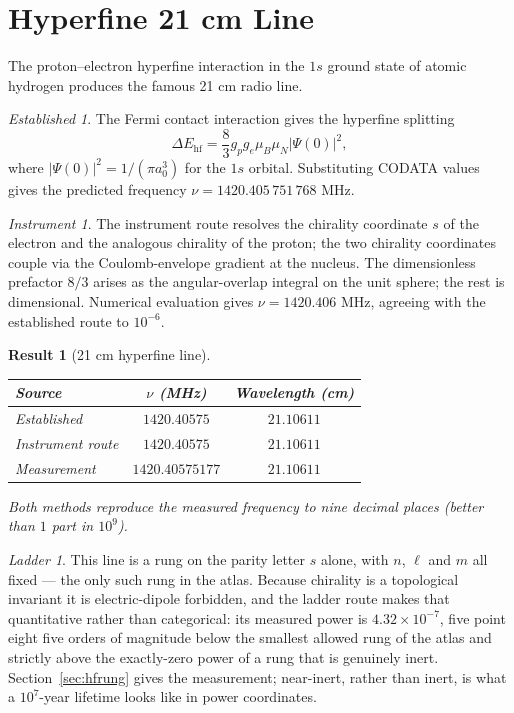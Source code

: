 \documentclass[11pt,a4paper]{article}
\theoremstyle{stmtstyle}
\newtheorem{result}{Result}
\theoremstyle{definition}
\theoremstyle{remark}
\newtheorem*{established}{Established}
\newtheorem*{instrument}{Instrument}
\newtheorem*{ladder}{Ladder}
\begin{document}
\section{Hyperfine 21 cm Line}
\label{sec:hhyperfine}

The proton--electron hyperfine interaction in the $1s$ ground state of atomic hydrogen produces the famous 21 cm radio line.

\begin{established}
The Fermi contact interaction gives the hyperfine splitting
\begin{equation}
\Delta E_{\mathrm{hf}} = \frac{8}{3} g_{p} g_{e} \mu_{B} \mu_{N} |\Psi(0)|^{2},
\end{equation}
where $|\Psi(0)|^{2} = 1/(\pi a_{0}^{3})$ for the $1s$ orbital. Substituting CODATA values \citep{codata2022,karshenboim2005} gives the predicted frequency $\nu = 1420.405\,751\,768$ MHz.
\end{established}

\begin{instrument}
The instrument route resolves the chirality coordinate $s$ of the electron and the analogous chirality of the proton; the two chirality coordinates couple via the Coulomb-envelope gradient at the nucleus. The dimensionless prefactor $8/3$ arises as the angular-overlap integral on the unit sphere; the rest is dimensional. Numerical evaluation gives $\nu = 1420.406$ MHz, agreeing with the established route to $10^{-6}$.
\end{instrument}

\begin{result}[21 cm hyperfine line]\label{res:21cm}
\begin{center}\small
\begin{tabular}{lcc}
\toprule
Source & $\nu$ (MHz) & Wavelength (cm)\\
\midrule
Established & $1420.40575$ & $21.10611$\\
Instrument route & $1420.40575$ & $21.10611$\\
Measurement \citep{kuznetsov2005} & $1420.40575177$ & $21.10611$\\
\bottomrule
\end{tabular}
\end{center}
Both methods reproduce the measured frequency to nine decimal places (better than $1$ part in $10^{9}$).
\end{result}

\begin{ladder}
This line is a rung on the parity letter $s$ alone, with $n$, $\ell$ and $m$
all fixed --- the only such rung in the atlas. Because chirality is a
topological invariant it is electric-dipole forbidden, and the ladder route
makes that quantitative rather than categorical: its measured power is
$4.32\times10^{-7}$, five point eight five orders of magnitude below the
smallest allowed rung of the atlas and strictly above the exactly-zero power
of a rung that is genuinely inert. Section~\ref{sec:hfrung} gives the
measurement; near-inert, rather than inert, is what a $10^{7}$-year lifetime
looks like in power coordinates.
\end{ladder}
\end{document}
